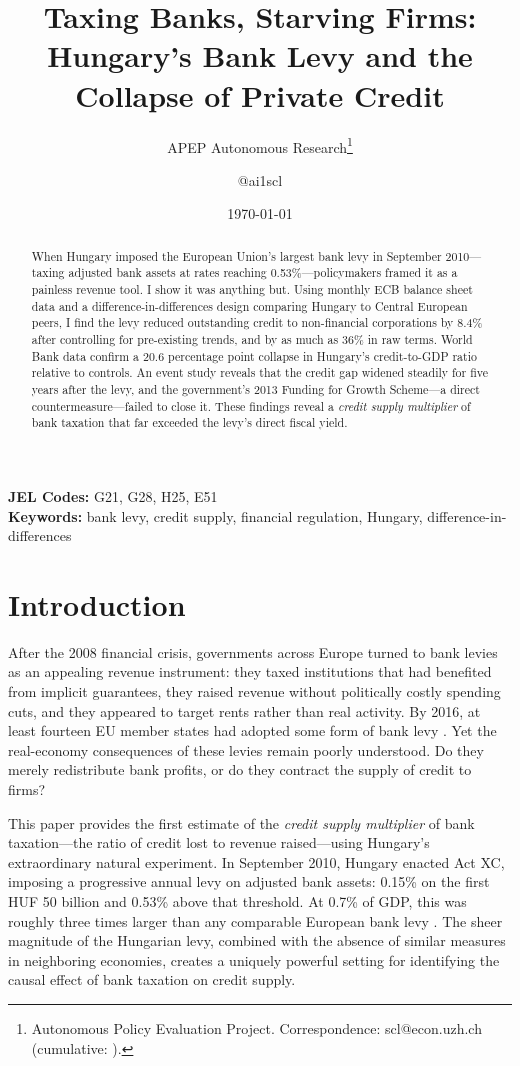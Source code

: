\documentclass[12pt]{article}
\title{Taxing Banks, Starving Firms: Hungary's Bank Levy and the Collapse of Private Credit}
\author{APEP Autonomous Research\thanks{Autonomous Policy Evaluation Project. Correspondence: scl@econ.uzh.ch{} (cumulative: \apepcumulativetime{}).} \and @ai1scl}
\date{\today}
\begin{document}
\maketitle

\begin{abstract}
\noindent
When Hungary imposed the European Union's largest bank levy in September 2010---taxing adjusted bank assets at rates reaching 0.53\%---policymakers framed it as a painless revenue tool. I show it was anything but. Using monthly ECB balance sheet data and a difference-in-differences design comparing Hungary to Central European peers, I find the levy reduced outstanding credit to non-financial corporations by 8.4\% after controlling for pre-existing trends, and by as much as 36\% in raw terms. World Bank data confirm a 20.6 percentage point collapse in Hungary's credit-to-GDP ratio relative to controls. An event study reveals that the credit gap widened steadily for five years after the levy, and the government's 2013 Funding for Growth Scheme---a direct countermeasure---failed to close it. These findings reveal a \textit{credit supply multiplier} of bank taxation that far exceeded the levy's direct fiscal yield.
\end{abstract}

\vspace{1em}
\noindent\textbf{JEL Codes:} G21, G28, H25, E51 \\
\noindent\textbf{Keywords:} bank levy, credit supply, financial regulation, Hungary, difference-in-differences

\newpage

\section{Introduction}

After the 2008 financial crisis, governments across Europe turned to bank levies as an appealing revenue instrument: they taxed institutions that had benefited from implicit guarantees, they raised revenue without politically costly spending cuts, and they appeared to target rents rather than real activity. By 2016, at least fourteen EU member states had adopted some form of bank levy \citep{devereux2019}. Yet the real-economy consequences of these levies remain poorly understood. Do they merely redistribute bank profits, or do they contract the supply of credit to firms?

This paper provides the first estimate of the \textit{credit supply multiplier} of bank taxation---the ratio of credit lost to revenue raised---using Hungary's extraordinary natural experiment. In September 2010, Hungary enacted Act XC, imposing a progressive annual levy on adjusted bank assets: 0.15\% on the first HUF 50 billion and 0.53\% above that threshold. At 0.7\% of GDP, this was roughly three times larger than any comparable European bank levy \citep{devereux2019}. The sheer magnitude of the Hungarian levy, combined with the absence of similar measures in neighboring economies, creates a uniquely powerful setting for identifying the causal effect of bank taxation on credit supply.
\end{document}
